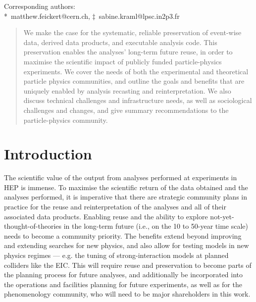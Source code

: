\documentclass[11pt]{article}
\begin{document}
\begin{center}
Corresponding authors:\\
*~matthew.feickert@cern.ch, $\ddagger$~sabine.kraml@lpsc.in2p3.fr
\end{center}


\begin{abstract}
\noindent We make the case for the systematic, reliable preservation of event-wise data, derived data products, and executable analysis code. This preservation enables the analyses' long-term future reuse, in order to maximise the scientific impact of publicly funded particle-physics experiments.
We cover the needs of both the experimental and theoretical particle physics communities, and outline the goals and benefits that are uniquely enabled by analysis recasting and reinterpretation. 
We also discuss technical challenges and infrastructure needs, as well as sociological challenges and changes, and give summary recommendations to the particle-physics community.
\end{abstract}





\clearpage
%
\tableofcontents
\clearpage
\section{Introduction}

The scientific value of the output from analyses performed at experiments in \gls{HEP} is immense.
To maximise the scientific return of the data obtained and the analyses performed, it is imperative that there are strategic community plans in practice for the reuse and reinterpretation of the analyses and all of their associated data products.
Enabling reuse and the ability to explore not-yet-thought-of-theories in the long-term future (i.e., on the 10 to 50-year time scale) needs to become a community priority.
The benefits extend beyond improving and extending searches for new physics, and also allow for testing models in new physics regimes --- e.g. the tuning of strong-interaction models at planned colliders like the \gls{EIC}.
This will require reuse and preservation to become parts of the planning process for future analyses, and additionally be incorporated into the operations and facilities planning for future experiments, as well as for the phenomenology community, who will need to be major shareholders in this work.
\end{document}
